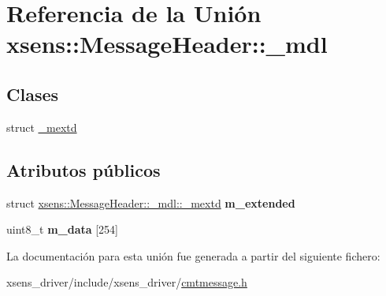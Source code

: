 \hypertarget{unionxsens_1_1MessageHeader_1_1__mdl}{\section{\-Referencia de la \-Unión xsens\-:\-:\-Message\-Header\-:\-:\-\_\-mdl}
\label{unionxsens_1_1MessageHeader_1_1__mdl}
}
\subsection*{\-Clases}
\begin{DoxyCompactItemize}
\item 
struct \hyperlink{structxsens_1_1MessageHeader_1_1__mdl_1_1__mextd}{\-\_\-mextd}
\end{DoxyCompactItemize}
\subsection*{\-Atributos públicos}
\begin{DoxyCompactItemize}
\item 
\hypertarget{unionxsens_1_1MessageHeader_1_1__mdl_a50dfc2b4f47c04403d08fd7334179b35}{struct \*
\hyperlink{structxsens_1_1MessageHeader_1_1__mdl_1_1__mextd}{xsens\-::\-Message\-Header\-::\-\_\-mdl\-::\-\_\-mextd} {\bfseries m\-\_\-extended}}\label{unionxsens_1_1MessageHeader_1_1__mdl_a50dfc2b4f47c04403d08fd7334179b35}

\item 
\hypertarget{unionxsens_1_1MessageHeader_1_1__mdl_adf02440dca11f4ac25d2d933d78e9c77}{uint8\-\_\-t {\bfseries m\-\_\-data} \mbox{[}254\mbox{]}}\label{unionxsens_1_1MessageHeader_1_1__mdl_adf02440dca11f4ac25d2d933d78e9c77}

\end{DoxyCompactItemize}


\-La documentación para esta unión fue generada a partir del siguiente fichero\-:\begin{DoxyCompactItemize}
\item 
xsens\-\_\-driver/include/xsens\-\_\-driver/\hyperlink{cmtmessage_8h}{cmtmessage.\-h}\end{DoxyCompactItemize}
